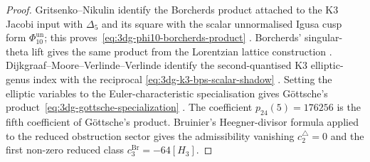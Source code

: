\begin{proof}
Gritsenko--Nikulin identify the Borcherds product attached to the K3
Jacobi input with $\Delta_5$ and its square with the scalar unnormalised
Igusa cusp form $\Phi_{10}^{\mathrm{un}}$; this
proves~\eqref{eq:3dg-phi10-borcherds-product}
\cite{GritsenkoNikulin1998}. Borcherds' singular-theta lift gives the
same product from the Lorentzian lattice construction
\cite{Borcherds1998}. Dijkgraaf--Moore--Verlinde--Verlinde identify
the second-quantised K3 elliptic-genus index with the reciprocal
\eqref{eq:3dg-k3-bps-scalar-shadow}
\cite{DijkgraafMooreVerlindeVerlinde1997}. Setting the elliptic
variables to the Euler-characteristic specialisation gives
G\"ottsche's product~\eqref{eq:3dg-gottsche-specialization}
\cite{Goettsche1990}.
The coefficient \(p_{24}(5)=176256\) is the fifth coefficient of
G\"ottsche's product. Bruinier's Heegner-divisor formula
\cite{Bruinier2002} applied to the reduced obstruction sector gives
the admissibility vanishing \(c_2^{\triangle}=0\) and the first
non-zero reduced class \(c_3^{\mathrm{Br}}=-64[H_3]\).
\end{proof}

